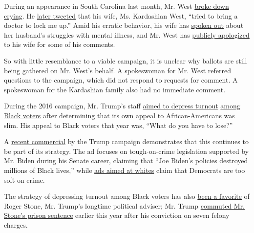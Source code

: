 During an appearance in South Carolina last month, Mr. West
\href{https://people.com/politics/kanye-west-first-campaign-rally-south-carolina/}{broke
down crying}. He
\href{https://pagesix.com/2020/07/20/kanye-west-says-kim-kardashian-tried-to-lock-me-up-in-twitter-rant/}{later
tweeted} that his wife, Ms. Kardashian West, ``tried to bring a doctor
to lock me up.'' Amid his erratic behavior, his wife has
\href{https://www.cnn.com/2020/07/22/entertainment/kim-kardashian-kanye-west-mental-health-statement/index.html}{spoken
out} about her husband's struggles with mental illness, and Mr. West has
\href{https://twitter.com/kanyewest/status/1287128322959237120}{publicly
apologized} to his wife for some of his comments.

So with little resemblance to a viable campaign, it is unclear why
ballots are still being gathered on Mr. West's behalf. A spokeswoman for
Mr. West referred questions to the campaign, which did not respond to
requests for comment. A spokeswoman for the Kardashian family also had
no immediate comment.

During the 2016 campaign, Mr. Trump's staff
\href{https://www.nytimes3xbfgragh.onion/2016/10/28/us/politics/donald-trump-campaign-voter-suppression.html}{aimed
to depress turnout}
\href{https://www.theatlantic.com/politics/archive/2016/10/trumps-black-voter-dilemma/505586/}{among
Black voters} after determining that its own appeal to African-Americans
was slim. His appeal to Black voters that year was, ``What do you have
to lose?''

A
\href{https://host2.advertisinganalyticsllc.com/admo/viewer/2343047}{recent
commercial} by the Trump campaign demonstrates that this continues to be
part of its strategy. The ad focuses on tough-on-crime legislation
supported by Mr. Biden during his Senate career, claiming that ``Joe
Biden's policies destroyed millions of Black lives,'' while
\href{https://www.bloomberg.com/news/articles/2020-07-27/trump-tailors-conflicting-ads-to-blacks-whites-on-biden-record}{ads
aimed at whites} claim that Democrats are too soft on crime.

The strategy of depressing turnout among Black voters has also
\href{https://theintercept.com/2017/03/06/facts-are-in-the-eye-of-the-beholder-says-roger-stone-trump-confidante-in-exclusive-interview/}{been
a favorite} of Roger Stone, Mr. Trump's longtime political adviser; Mr.
Trump
\href{https://www.nytimes3xbfgragh.onion/2020/07/10/us/politics/trump-roger-stone-clemency.html}{commuted
Mr. Stone's prison sentence} earlier this year after his conviction on
seven felony charges.


